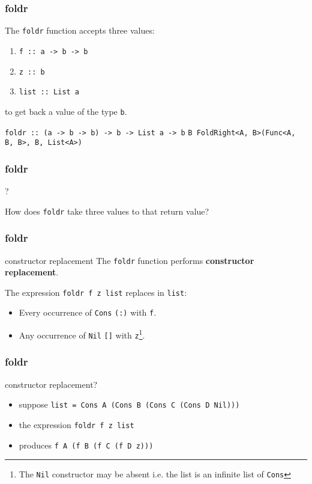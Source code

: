 \begin{frame}
\frametitle{foldr}
The \lstinline[basicstyle=\ttfamily]$foldr$ function accepts three values:
\begin{enumerate}
\item \lstinline[basicstyle=\ttfamily]$f :: a -> b -> b$
\item \lstinline[basicstyle=\ttfamily]$z :: b$
\item \lstinline[basicstyle=\ttfamily]$list :: List a$
\end{enumerate}
to get back a value of the type \lstinline[basicstyle=\ttfamily]$b$.

\hrulefill

\lstinline[basicstyle=\ttfamily]$foldr :: (a -> b -> b) -> b -> List a -> b$
\lstinline[basicstyle=\ttfamily]$B FoldRight<A, B>(Func<A, B, B>, B, List<A>)$
\end{frame}

\begin{frame}
\frametitle{foldr}
\begin{block}{?}
\begin{center}
How does \lstinline[basicstyle=\ttfamily]$foldr$ take three values to that return value?
\end{center}
\end{block}
\end{frame}

\begin{frame}
\frametitle{foldr}
\begin{block}{constructor replacement}
The \lstinline[basicstyle=\ttfamily]$foldr$ function performs \textbf{constructor replacement}.
\end{block}
The expression \lstinline[basicstyle=\ttfamily]$foldr f z list$ replaces in \lstinline[basicstyle=\ttfamily]$list$:
\begin{itemize}
\item Every occurrence of \lstinline{Cons} \lstinline[basicstyle=\ttfamily]$(:)$ with \lstinline[basicstyle=\ttfamily]$f$.
\item Any occurrence of \lstinline{Nil} \lstinline[basicstyle=\ttfamily]$[]$ with \lstinline[basicstyle=\ttfamily]$z$\footnote{The \lstinline{Nil} constructor may be absent \textemdash i.e. the list is an infinite list of \lstinline{Cons}}.
\end{itemize}
\end{frame}

\begin{frame}
\frametitle{foldr}
\begin{block}{constructor replacement?}
\small
\begin{itemize}
\item suppose \lstinline[basicstyle=\ttfamily]$list = Cons A (Cons B (Cons C (Cons D Nil)))$
\item the expression \lstinline[basicstyle=\ttfamily, mathescape]!foldr f z list!
\item produces \lstinline[basicstyle=\ttfamily]$f A (f B (f C (f D z)))$
\end{itemize}
\end{block}
\end{frame}

